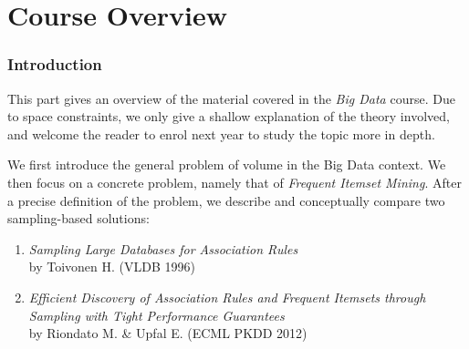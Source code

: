 \documentclass[11pt]{sigplanconf}
\renewcommand\it{\textit}
\begin{document}

\part{Course Overview}\label{part1}

\section{Introduction}
This part gives an overview of the material covered in the \textit{Big Data} course. Due to space constraints, we only give a shallow explanation of the theory involved, and welcome the reader to enrol next year to study the topic more in depth.

We first introduce the general problem of volume in the Big Data context. We then focus on a concrete problem, namely that of \it{Frequent Itemset Mining}. After a precise definition of the problem, we describe and conceptually compare two sampling-based solutions:
\begin{enumerate}
\item \it{Sampling Large Databases for Association Rules} \\
by Toivonen H. (VLDB 1996)
\item \it{Efficient Discovery of Association Rules and Frequent Itemsets through Sampling with Tight Performance Guarantees} \\
by Riondato M. \& Upfal E. (ECML PKDD 2012)
\end{enumerate}
\end{document}
